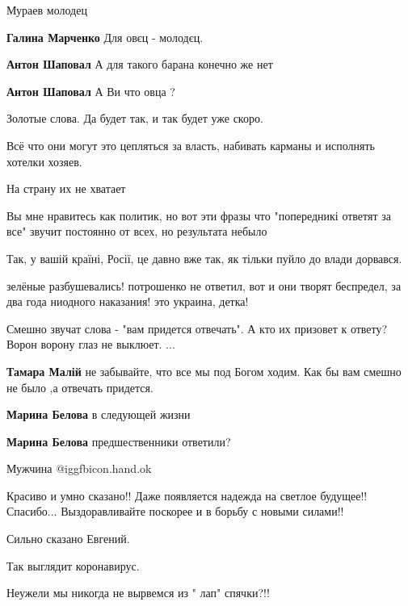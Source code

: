 \begin{itemize}
Мураев молодец

\begin{itemize} %
\textbf{Галина Марченко} Для овєц - молодєц.

\textbf{Антон Шаповал} А для такого барана конечно же нет

\textbf{Антон Шаповал} А Ви что овца ?
\end{itemize} %

Золотые слова. Да будет так, и так будет уже скоро.


Всё что они могут это цепляться за власть, набивать карманы и исполнять хотелки
хозяев.

На страну их не хватает

Вы мне нравитесь как политик, но вот эти фразы что "попередникі ответят за все" звучит постоянно от всех, но результата небыло

Так, у вашій країні, Росії, це давно вже так, як тільки пуйло до влади дорвався.

зелёные разбушевались! потрошенко не ответил, вот и они творят беспредел, за два года ниодного наказания! это украина, детка!

Смешно звучат слова - "вам придется отвечать". А кто их призовет к ответу? Ворон ворону глаз не выклюет. ...

\begin{itemize} %
\textbf{Тамара Малій} не забывайте, что все мы под Богом ходим. Как бы вам смешно не было ,а отвечать придется.

\textbf{Марина Белова} в следующей жизни

\textbf{Марина Белова} предшественники ответили?
\end{itemize} %

Мужчина @igg{fbicon.hand.ok} 

Красиво и умно сказано!! Даже появляется надежда на светлое будущее!! Спасибо... Выздоравливайте поскорее и в борьбу с новыми силами!!

Сильно сказано Евгений.

Так выглядит коронавирус.

Неужели мы никогда не вырвемся из " лап" спячки?!!


\end{itemize}
